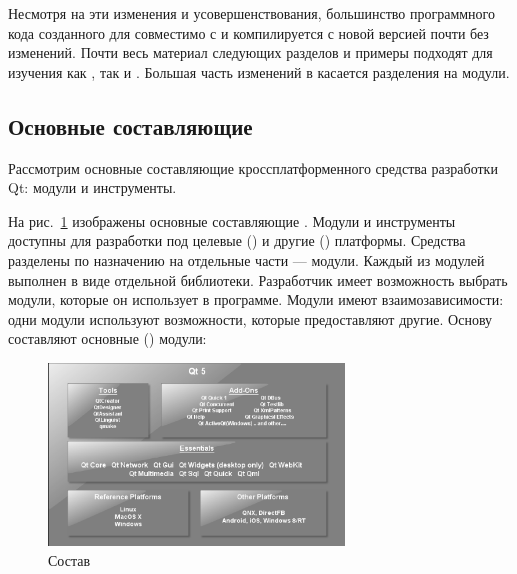 Несмотря на эти изменения и усовершенствования, большинство программного кода созданного для 
совместимо с  и компилируется с новой версией почти без изменений. Почти весь материал 
следующих разделов и примеры
подходят для изучения как , так и . Большая часть изменений в  касается 
разделения на модули. 

\subsection{Основные составляющие }
Рассмотрим основные составляющие кроссплатформенного средства разработки Qt: модули и инструменты.

На рис.~\ref{ch11:refDrawing0} изображены основные составляющие . Модули и инструменты
доступны для разработки под целевые () и другие () платформы. 
Средства  разделены по назначению на
отдельные части --- модули. Каждый из модулей выполнен в виде отдельной библиотеки. Разработчик имеет возможность выбрать
модули, которые он использует в программе. Модули имеют взаимозависимости: одни модули используют возможности, которые
предоставляют другие. Основу составляют основные () модули:

\begin{figure}[htb]
\begin{center}
\includegraphics[width=0.7\textwidth]{img/ris_11_1}
\caption[Состав ]{Состав }
\label{ch11:refDrawing0}
\end{center}
\end{figure}

